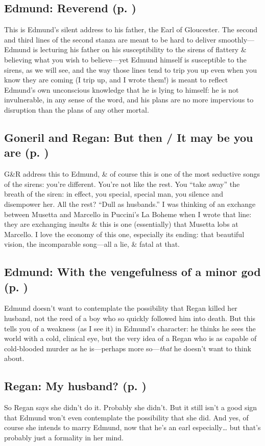 \subsection*{Edmund: Reverend (p. \pageref{ch:lear_al})}
This is Edmund's silent address to his father, the Earl of Gloucester. The second and third lines of the second stanza are meant to be hard to deliver smoothly---Edmund is lecturing his father on his susceptibility to the sirens of flattery \& believing what you wish to believe---yet Edmund himself is susceptible to the sirens, as we will see, and the way those lines tend to trip you up even when you know they are coming (I trip up, and I wrote them!) is meant to reflect Edmund's own unconscious knowledge that he is lying to himself: he is not invulnerable, in any sense of the word, and his plans are no more impervious to disruption than the plans of any other mortal.

\subsection*{Goneril and Regan: But then / It may be you are (p. \pageref{ch:lear_am})}
G\&R address this to Edmund, \& of course this is one of the most seductive songs of the sirens: you're different. You're not like the rest. You ``take away'' the breath of the siren: in effect, you special, special man, you silence and disempower her. All the rest? ``Dull as husbands.'' I was thinking of an exchange between Musetta and Marcello in Puccini's La Boheme when I wrote that line: they are exchanging insults \& this is one (essentially) that Musetta lobs at Marcello. I love the economy of this one, especially its ending: that beautiful vision, the incomparable song---all a lie, \& fatal at that.

\subsection*{Edmund: With the vengefulness of a minor god (p. \pageref{ch:lear_an})}
Edmund doesn't want to contemplate the possibility that Regan killed her husband, not the reed of a boy who so quickly followed him into death. But this tells you of a weakness (as I see it) in Edmund's character: he thinks he sees the world with a cold, clinical eye, but the very idea of a Regan who is as capable of cold-blooded murder as he is---perhaps more so---\emph{that} he doesn't want to think about.

\subsection*{Regan: My husband? (p. \pageref{ch:lear_ao})}
So Regan says she didn't do it. Probably she didn't. But it still isn't a good sign that Edmund won't even contemplate the possibility that she did. And yes, of course she intends to marry Edmund, now that he's an earl especially\ldots{} but that's probably just a formality in her mind.

